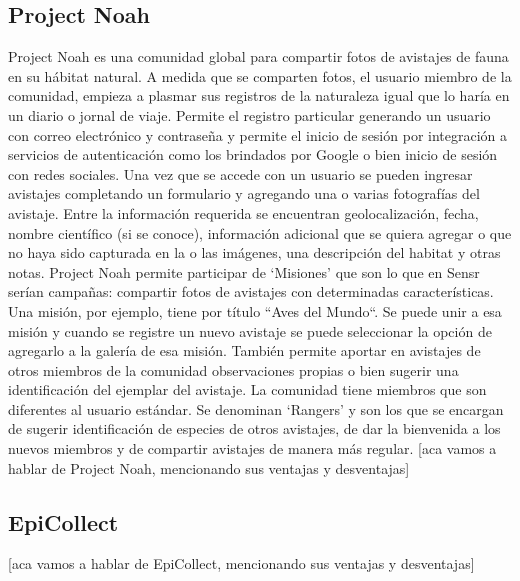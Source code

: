 \subsection{Project Noah}
Project Noah es una comunidad global para compartir fotos de avistajes de fauna en su hábitat natural. A medida que se comparten fotos, el usuario miembro de la comunidad, empieza a plasmar sus registros de la naturaleza igual que lo haría en un diario o jornal de viaje. 
Permite el registro particular generando un usuario con correo electrónico y contraseña y permite el inicio de sesión por integración a servicios de autenticación como los brindados por Google o bien inicio de sesión con redes sociales.
Una vez que se accede con un usuario se pueden ingresar avistajes completando un formulario y agregando una o varias fotografías del avistaje. Entre la información requerida se encuentran geolocalización, fecha, nombre científico (si se conoce), información adicional que se quiera agregar o que no haya sido capturada en la o las imágenes, una descripción del habitat y otras notas. 
Project Noah permite participar de ‘Misiones’ que son lo que en Sensr serían campañas: compartir fotos de avistajes con determinadas características. Una misión, por ejemplo, tiene por título ``Aves del Mundo“. Se puede unir a esa misión y cuando se registre un nuevo avistaje se puede seleccionar la opción de agregarlo a la galería de esa misión. También permite aportar en avistajes de otros miembros de la comunidad observaciones propias o bien sugerir una identificación del ejemplar del avistaje.
La comunidad tiene miembros que son diferentes al usuario estándar. Se denominan ‘Rangers’ y son los que se encargan de sugerir identificación de especies de otros avistajes, de dar la bienvenida a los nuevos miembros y de compartir avistajes de manera más regular. 
[aca vamos a hablar de Project Noah, mencionando sus ventajas y desventajas]

\subsection{EpiCollect}
[aca vamos a hablar de EpiCollect, mencionando sus ventajas y desventajas]

